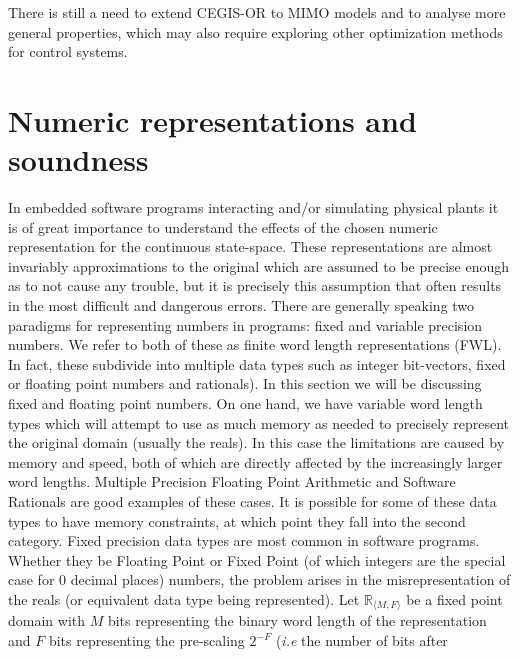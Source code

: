 \documentclass[sigconf]{llncs}
\begin{document}
There is still a need to extend CEGIS-OR to MIMO models and to analyse more general properties, 
which may also require exploring other optimization methods for control systems. 

\newpage


\newpage
\appendix

\section{Numeric representations and soundness} \label{sec:numeric_rep}

In embedded software programs interacting and/or simulating physical plants it
is of great importance to understand the effects of the chosen numeric
representation for the continuous state-space. 
These representations are almost invariably approximations to the original which
are assumed to be precise enough as to not cause any trouble, but it is precisely
this assumption that often results in the most difficult and dangerous errors.
There are generally speaking two paradigms for representing numbers in programs:
fixed and variable precision numbers.  We refer to both of these as finite word
length representations (FWL).  In fact, these subdivide into multiple data types
such as integer bit-vectors, fixed or floating point numbers and rationals). In 
this section we will be discussing fixed and floating point numbers.
On one hand, we have variable word length types which will attempt to use as
much memory as needed to precisely represent the original domain (usually the
reals). In this case the limitations are caused by memory and speed, both of
which are directly affected by the increasingly larger word lengths. Multiple
Precision Floating Point Arithmetic and Software Rationals are good examples of
these cases. It is possible for some of these data types to have memory
constraints, at which point they fall into the second category.
Fixed precision data types are most common in software programs. Whether
they be Floating Point or Fixed Point (of which integers are the special case
for 0 decimal places) numbers, the problem arises in the misrepresentation of
the reals (or equivalent data type being represented).
Let $\mathbb{R}_{\langle M,F \rangle}$ be a fixed point domain with $M$ bits
representing the binary word length of the representation and $F$ bits
representing the pre-scaling $2^{-F}$ (\emph{i.e} the number of bits after
\end{document}

